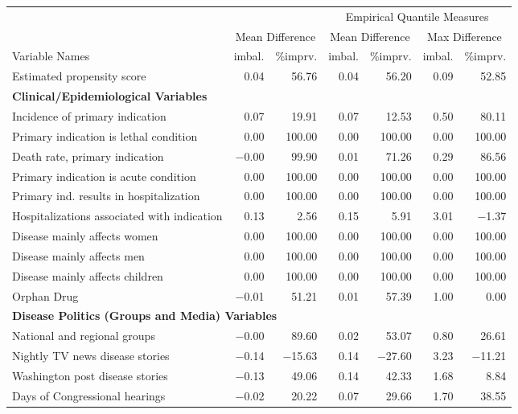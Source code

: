 \documentclass[11pt,titlepage]{article}
\begin{document}
\begin{table}[t]
\begin{center}
\setlength{\tabcolsep}{2pt}
\begin{tabular}{lrrrrrr}
\hline
\hline
 & \multicolumn{2}{c}{} 
 & \multicolumn{4}{c}{Empirical Quantile Measures} \\
 & \multicolumn{2}{c}{Mean Difference} 
 & \multicolumn{2}{c}{Mean Difference} 
 & \multicolumn{2}{c}{Max Difference} \\
Variable Names 
& imbal. & \%imprv.
& imbal. & \%imprv.  
& imbal. & \%imprv. \\
\hline
Estimated propensity score & 0.04 & 56.76 & 0.04 & 56.20 & 0.09 & 52.85 \\
{\bf Clinical/Epidemiological Variables} & \\
Incidence of primary indication & 0.07 & 19.91 & 0.07 & 12.53 & 0.50 & 80.11 \\
Primary indication is lethal condition & 0.00 & 100.00 & 0.00 & 100.00 & 0.00 & 100.00 \\
Death rate, primary indication & $-$0.00 & 99.90 & 0.01 & 71.26 & 0.29 & 86.56 \\
Primary indication is acute condition & 0.00 & 100.00 & 0.00 & 100.00 & 0.00 & 100.00 \\
Primary ind. results in hospitalization & 0.00 & 100.00 & 0.00 & 100.00 & 0.00 & 100.00 \\
Hospitalizations associated with indication & 0.13 & 2.56 & 0.15 & 5.91 & 3.01 & $-$1.37 \\
Disease mainly affects women & 0.00 & 100.00 & 0.00 & 100.00 & 0.00 & 100.00 \\
Disease mainly affects men & 0.00 & 100.00 & 0.00 & 100.00 & 0.00 & 100.00 \\
Disease mainly affects children & 0.00 & 100.00 & 0.00 & 100.00 & 0.00 & 100.00 \\
Orphan Drug & $-$0.01 & 51.21 & 0.01 & 57.39 & 1.00 & 0.00 \\
\multicolumn{3}{l}{\bf Disease Politics (Groups and Media) Variables} & \\
National and regional groups & $-$0.00 & 89.60 & 0.02 & 53.07 & 0.80 & 26.61 \\
Nightly TV news disease stories & $-$0.14 & $-$15.63 & 0.14 & $-$27.60 & 3.23 & $-$11.21 \\
Washington post disease stories & $-$0.13 & 49.06 & 0.14 & 42.33 & 1.68 & 8.84 \\
Days of Congressional hearings & $-$0.02 & 20.22 & 0.07 & 29.66 & 1.70 & 38.55 \\

\end{tabular}
\end{center}
\end{table}
\end{document}
